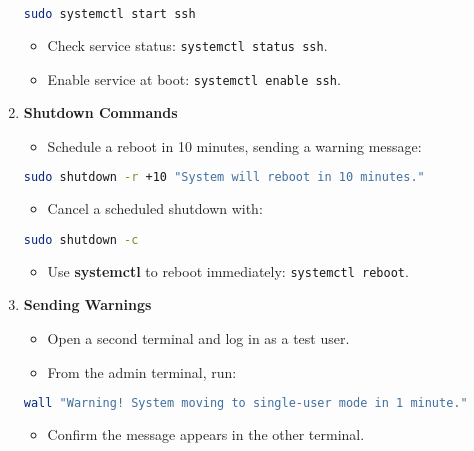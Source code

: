 \documentclass[a4paper]{report}
\begin{document}
\begin{enumerate}
\begin{lstlisting}[language=bash]
sudo systemctl start ssh
\end{lstlisting}

\begin{itemize}
        \item Check service status: \texttt{systemctl status ssh}.
        \item Enable service at boot: \texttt{systemctl enable ssh}.
    \end{itemize}
    \item \textbf{Shutdown Commands}
    \begin{itemize}
        \item Schedule a reboot in 10 minutes, sending a warning message:
\end{itemize}

\begin{lstlisting}[language=bash]
sudo shutdown -r +10 "System will reboot in 10 minutes."
\end{lstlisting}

\begin{itemize}
        \item Cancel a scheduled shutdown with:
\end{itemize}

\begin{lstlisting}[language=bash]
sudo shutdown -c
\end{lstlisting}

\begin{itemize}
        \item Use \textbf{systemctl} to reboot immediately: \texttt{systemctl reboot}.
    \end{itemize}
    \item \textbf{Sending Warnings}
    \begin{itemize}
        \item Open a second terminal and log in as a test user.
        \item From the admin terminal, run:
\end{itemize}

\begin{lstlisting}[language=bash]
wall "Warning! System moving to single-user mode in 1 minute."
\end{lstlisting}

\begin{itemize}
        \item Confirm the message appears in the other terminal.
    \end{itemize}
\end{enumerate}
\end{document}
